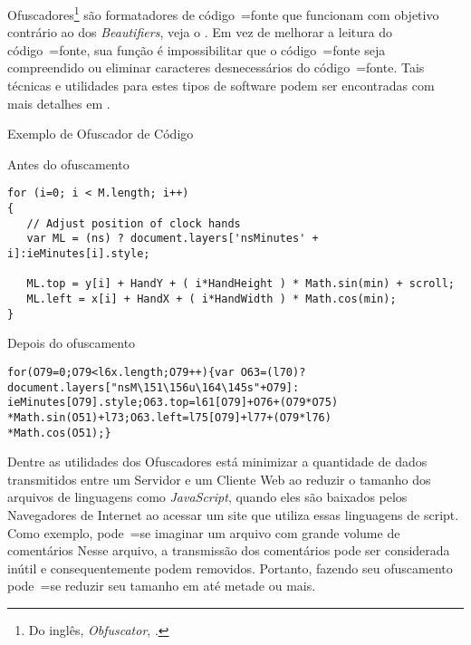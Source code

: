 Ofuscadores\footnote{Do inglês,
\textit{Obfuscator},
.
}
são formatadores de código~=fonte que funcionam com objetivo contrário ao dos \textit{Beautifiers},
veja o .
Em vez de melhorar a leitura do código~=fonte,
sua função é impossibilitar que o código~=fonte seja compreendido ou
eliminar caracteres desnecessários do código~=fonte.
Tais técnicas e
utilidades para estes tipos de software podem ser encontradas com mais detalhes em .
\begin{quadro}[!htb]
\caption[Exemplo de Ofuscador de Código]{Exemplo de Ofuscador de Código \cite{familyOfSourceCodeObfuscators}}
\label{exemploDeOfuscador}
\begin{bluebox}
\begin{code}
\caption{Antes do ofuscamento}
\begin{verbatim}
for (i=0; i < M.length; i++)
{
   // Adjust position of clock hands
   var ML = (ns) ? document.layers['nsMinutes' + i]:ieMinutes[i].style;

   ML.top = y[i] + HandY + ( i*HandHeight ) * Math.sin(min) + scroll;
   ML.left = x[i] + HandX + ( i*HandWidth ) * Math.cos(min);
}
\end{verbatim}
\end{code}

\begin{code}
\caption{Depois do ofuscamento}
\begin{verbatim}
for(O79=0;O79<l6x.length;O79++){var O63=(l70)?
document.layers["nsM\151\156u\164\145s"+O79]:
ieMinutes[O79].style;O63.top=l61[O79]+O76+(O79*O75)
*Math.sin(O51)+l73;O63.left=l75[O79]+l77+(O79*l76)
*Math.cos(O51);}
\end{verbatim}
\end{code}
\end{bluebox}
\end{quadro}

Dentre as utilidades dos Ofuscadores está minimizar a quantidade de dados transmitidos entre um Servidor e
um Cliente Web ao reduzir o tamanho dos arquivos de linguagens como \textit{JavaScript},
quando eles são baixados pelos Navegadores de Internet ao acessar um site que utiliza essas linguagens de script.
Como exemplo,
pode~=se imaginar um arquivo com grande volume de comentários Nesse arquivo,
a transmissão dos comentários pode ser considerada inútil e
consequentemente podem removidos.
Portanto,
fazendo seu ofuscamento pode~=se reduzir seu tamanho em até metade ou
mais.

